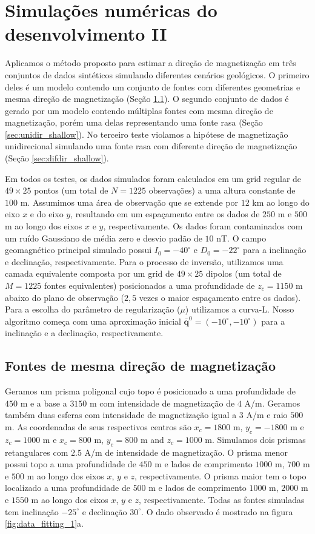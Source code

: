 \chapter{Simulações numéricas do desenvolvimento II}
\label{chap:synt_tests}

Aplicamos o método proposto para estimar a direção de magnetização em três conjuntos de dados sintéticos simulando diferentes cenários geológicos. O primeiro deles é um modelo contendo um conjunto de fontes com diferentes geometrias e mesma direção de magnetização (Seção \ref{sec:unidir_model}). O segundo conjunto de dados é gerado por um modelo contendo múltiplas fontes com mesma direção de magnetização, porém uma delas representando uma fonte rasa (Seção \ref{sec:unidir_shallow}). No terceiro teste violamos a hipótese de magnetização unidirecional simulando uma fonte rasa com diferente direção de magnetização (Seção \ref{sec:difdir_shallow}).  

Em todos os testes, os dados simulados foram calculados em um grid regular de $49 \times 25$ pontos (um total de $N = 1225$ observações) a uma altura constante de $100$ m. Assumimos uma área de observação que se extende por $12$ km ao longo do eixo $x$ e do eixo $y$, resultando em um espaçamento entre os dados de $250$ m e $500$ m ao longo dos eixos $x$ e $y$, respectivamente. Os dados foram contaminados com um ruído Gaussiano de média zero e desvio padão de $10$ nT. O campo geomagnético principal simulado possui $I_0 = -40^\circ$ e $D_0 = -22^\circ$ para a inclinação e declinação, respectivamente. Para o processo de inversão, utilizamos uma camada equivalente composta por um grid de $49 \times 25$ dipolos (um total de $M = 1225$ fontes equivalentes) posicionados a uma profundidade de $z_c = 1150$ m abaixo do plano de observação ($2,5$ vezes o maior espaçamento entre os dados). Para a escolha do parâmetro de regularização ($\mu$) utilizamos a curva-L. Nosso algoritmo começa com uma aproximação inicial $\bar{\mathbf{q}}^{0} = (-10^\circ,-10^\circ)$ para a inclinação e a declinação, respectivamente. 

\section{Fontes de mesma direção de magnetização}
\label{sec:unidir_model}

Geramos um prisma poligonal cujo topo é posicionado a uma profundidade de $450$ m e a base a $3150$ m com intensidade de magnetização de $4$ A/m. Geramos também duas esferas com intensidade de magnetização igual a $3$ A/m e raio $500$ m. As coordenadas de seus respectivos centros são $x_c = 1800$ m, $y_c = -1800$ m e $z_c = 1000$ m e $x_c = 800$ m, $y_c = 800$ m and $z_c= 1000$ m. Simulamos dois prismas retangulares com $2.5$ A/m de intensidade de magnetização. O prisma menor possui topo a uma profundidade de $450$ m e lados de comprimento $1000$ m, $700$ m e $500$ m ao longo dos eixos $x$, $y$ e $z$, respectivamente. O prisma maior tem o topo localizado a uma profundidade de $500$ m e lados de comprimento $1000$ m, $2000$ m e $1550$ m ao longo dos eixos $x$, $y$ e $z$, respectivamente. Todas as fontes simuladas tem inclinação $-25^\circ$ e declinação $30^\circ$. O dado observado é mostrado na figura \ref{fig:data_fitting_1}a.

